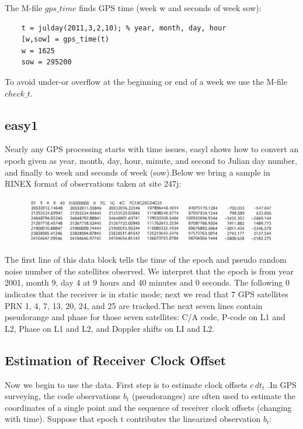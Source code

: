	The M-file $gps\_time$ finds GPS time (week w and seconds of week sow):
	
	\begin{lstlisting} 
	t = julday(2011,3,2,10); % year, month, day, hour
	[w,sow] = gps_time(t)
	w = 1625
	sow = 295200
	\end{lstlisting}
	To avoid under-or overflow at the beginning or end of a week we use the M-file $check\_t$.
	
	\subsection{easy1}\label{subsec:easy1}
	
	Nearly any GPS processing starts with time issues, easyl shows how to convert an epoch given as year, month, day, hour, minute, and second to Julian day number, and finally to week and seconds of week (sow).Below we bring a sample in RINEX format of observations taken at site 247j:
	\begin{figure}
		\centering
		\includegraphics[width=0.7\linewidth]{TeX_files/Part03/chapter09/image/9-site247j}
	\end{figure}
	The first line of this data block tells the time of the epoch and pseudo random noise number of the satellites observed. We interpret that the epoch is from year 2001, month 9, day 4 at 9 hours and 40 minutes and 0 seconds. The following 0 indicates that the receiver is in static mode; next we read that 7 GPS satellites PRN 1, 4, 7, 13, 20, 24, and 25 are tracked.The next seven lines contain pseudorange and phase for those seven satellites: C/A code, P-code on L1 and L2, Phase on L1 and L2, and Doppler shifts on LI and L2.
	
	\subsection{Estimation of Receiver Clock Offset}
	
	Now we begin to use the data. First step is to estimate clock offsets $c\,dt_t$ .In GPS surveying, the code observations $b_t$ (pseudoranges) are often used to estimate the coordinates of a single point and the sequence of receiver clock offsets (changing with time). Suppose that epoch t contributes the linearized observation $b_t$:
	
